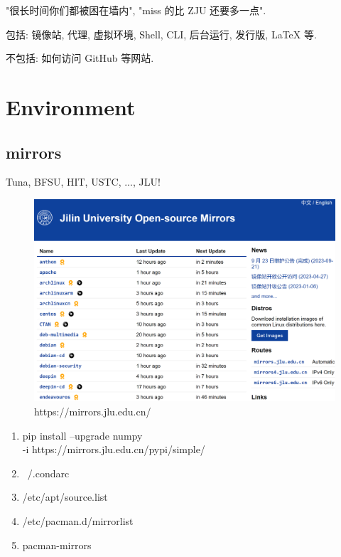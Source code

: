 \documentclass[a4paper]{article}
\begin{document}
"很长时间你们都被困在墙内", "miss 的比 ZJU 还要多一点".

包括: 镜像站, 代理, 虚拟环境, Shell, CLI, 后台运行, 发行版, LaTeX 等.

不包括: 如何访问 GitHub 等网站.

\section{\LARGE Environment}

\subsection{\LARGE mirrors}

Tuna, BFSU, HIT, USTC, ..., JLU!

\begin{figure}[hb]
    \centering
    \includegraphics[height=.4\textheight]{figures/mirror.png}
    \caption{https://mirrors.jlu.edu.cn/}
\end{figure}

\begin{enumerate}[leftmargin=2cm, itemindent=1cm]
    \tt
    \item pip install --upgrade numpy \\ -i https://mirrors.jlu.edu.cn/pypi/simple/
    \item ~/.condarc
    \item /etc/apt/source.list
    \item /etc/pacman.d/mirrorlist
    \item pacman-mirrors
\end{enumerate}
\end{document}
